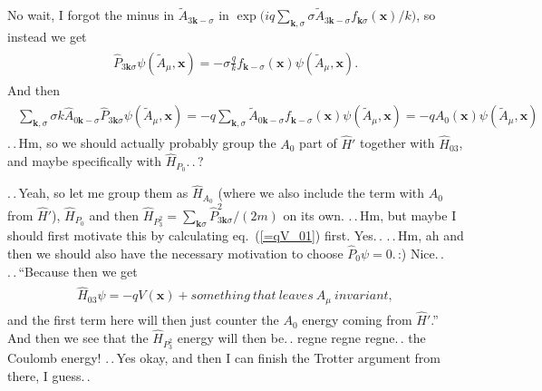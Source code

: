 \documentclass{report}
\begin{document}
No wait, I forgot the minus in $\tilde A_{3\boldsymbol{k}-\sigma}$ in  $\exp\big(
	i q \sum_{\boldsymbol{k}, \sigma} \sigma \tilde A_{3\boldsymbol{k}-\sigma} 
	f_{\boldsymbol{k}\sigma}(\boldsymbol{x}) / k
\big)$, so instead we get
\begin{align}
\begin{aligned}
	\hat P_{3 \boldsymbol k \sigma} \psi(\tilde A_\mu, \boldsymbol{x}) = 
		-\sigma\frac{q}{k}
		f_{\boldsymbol{k}-\sigma}(\boldsymbol{x}) \psi(\tilde A_\mu, \boldsymbol{x}).
\end{aligned}
\end{align}
And then
\begin{align}
\begin{aligned}
	\sum_{\boldsymbol k, \sigma} 
		\sigma k \hat{A}_{0 \boldsymbol k -\sigma} 
		\hat P_{3 \boldsymbol k \sigma} 
		\psi(\tilde A_\mu, \boldsymbol{x}) 
	= 
	-q\sum_{\boldsymbol k, \sigma}
		\tilde A_{0 \boldsymbol k -\sigma} 
		f_{\boldsymbol{k} -\sigma}(\boldsymbol{x}) 
		\psi(\tilde A_\mu, \boldsymbol{x})
	= 
	-q A_0(\boldsymbol{x}) \psi(\tilde A_\mu, \boldsymbol{x})
	\label{=qV_01}
\end{aligned}
\end{align}
.\,.\,Hm, so we should actually probably group the $A_0$ part of $\hat H'$ together with $\hat H_{03}$, and maybe specifically with $\hat H_{P_0}$.\,.\,? %

.\,.\,Yeah, so let me group them as $\hat H_{A_0}$ (where we also include the term with $A_0$ from $\hat H'$), $\hat H_{P_0}$ and then $\hat H_{P_3^2} = \sum_{\boldsymbol{k}\sigma} \hat P_{3\boldsymbol{k}\sigma}^2/(2m)$ on its own. .\,.\,Hm, but maybe I should first motivate this by calculating eq.\ (\ref{=qV_01}) first. Yes.\,. .\,.\,Hm, ah and then we should also have the necessary motivation to choose $\hat P_0 \psi = 0$.\,:) Nice.\,. .\,.\,``Because then we get
\begin{align}
\begin{aligned}
	\hat H_{03} \psi = -q V(\boldsymbol{x}) + something\ that\ leaves\ A_\mu\ invariant,
\end{aligned}
\end{align}
and the first term here will then just counter the $A_0$ energy coming from $\hat H'$.'' 
And then we see that the $\hat H_{P_3^2}$ energy will then be.\,. regne regne regne.\,. the Coulomb energy! .\,.\,Yes okay, and then I can finish the Trotter argument from there, I guess.\,. %
\end{document}
